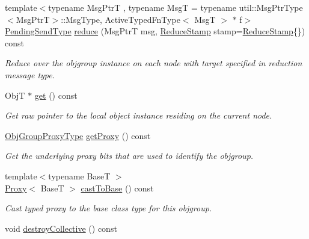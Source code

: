 \begin{DoxyCompactItemize}
\item 
{\footnotesize template$<$typename Msg\+PtrT , typename MsgT  = typename util\+::\+Msg\+Ptr\+Type$<$\+Msg\+Ptr\+T$>$\+::\+Msg\+Type, Active\+Typed\+Fn\+Type$<$ Msg\+T $>$ $\ast$ f$>$ }\\\hyperlink{structvt_1_1objgroup_1_1proxy_1_1_proxy_a1bdf8713203531d306702a024872bb08}{Pending\+Send\+Type} \hyperlink{structvt_1_1objgroup_1_1proxy_1_1_proxy_ad481da6a8dff55801daa9250420bae9c}{reduce} (Msg\+PtrT msg, \hyperlink{structvt_1_1objgroup_1_1proxy_1_1_proxy_a337be4c20cf11ff6477c7a66208cc909}{Reduce\+Stamp} stamp=\hyperlink{structvt_1_1objgroup_1_1proxy_1_1_proxy_a337be4c20cf11ff6477c7a66208cc909}{Reduce\+Stamp}\{\}) const
\begin{DoxyCompactList}\small\item\em Reduce over the objgroup instance on each node with target specified in reduction message type. \end{DoxyCompactList}\item 
ObjT $\ast$ \hyperlink{structvt_1_1objgroup_1_1proxy_1_1_proxy_a62eef779c097c8398e249827e4ad7c6a}{get} () const
\begin{DoxyCompactList}\small\item\em Get raw pointer to the local object instance residing on the current node. \end{DoxyCompactList}\item 
\hyperlink{namespacevt_ad7cae989df485fccca57f0792a880a8e}{Obj\+Group\+Proxy\+Type} \hyperlink{structvt_1_1objgroup_1_1proxy_1_1_proxy_a76cda2351cf7801abe2ebffa1403c5b8}{get\+Proxy} () const
\begin{DoxyCompactList}\small\item\em Get the underlying proxy bits that are used to identify the objgroup. \end{DoxyCompactList}\item 
{\footnotesize template$<$typename BaseT $>$ }\\\hyperlink{structvt_1_1objgroup_1_1proxy_1_1_proxy}{Proxy}$<$ BaseT $>$ \hyperlink{structvt_1_1objgroup_1_1proxy_1_1_proxy_a28d396f4a46a50150ee94ec754c1ae85}{cast\+To\+Base} () const
\begin{DoxyCompactList}\small\item\em Cast typed proxy to the base class type for this objgroup. \end{DoxyCompactList}\item 
void \hyperlink{structvt_1_1objgroup_1_1proxy_1_1_proxy_a6758c7979d1f69722449cb78f998cbf1}{destroy\+Collective} () const

\end{DoxyCompactItemize}
